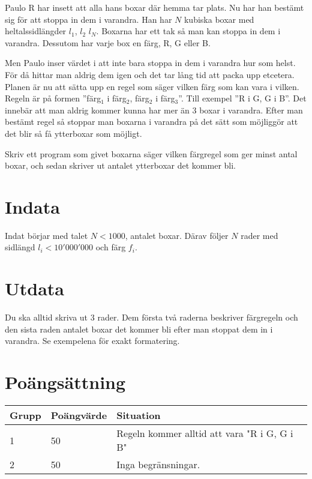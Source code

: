 
Paulo R har insett att alla hans boxar där hemma tar plats. Nu har han bestämt
sig för att stoppa in dem i varandra. Han har $N$ kubiska boxar med
heltalssidlängder $l_1$, $l_2$ \ellipsis $l_N$. Boxarna har ett tak så man kan stoppa in
dem i varandra. Dessutom har varje box en färg, R, G eller B.

Men Paulo inser värdet i att inte bara stoppa in dem i varandra hur som helst.
För då hittar man aldrig dem igen och det tar lång tid att packa upp etcetera.
Planen är nu att sätta upp en regel som säger vilken färg som kan vara i
vilken. Regeln är på formen ''färg$_1$ i färg$_2$, färg$_2$ i färg$_3$''. Till exempel ''R i
G, G i B''. Det innebär att man aldrig kommer kunna har mer än 3 boxar i
varandra. Efter man bestämt regel så stoppar man boxarna i varandra på det sätt
som möjliggör att det blir så få ytterboxar som möjligt.

Skriv ett program som givet boxarna säger vilken färgregel som ger minst antal
boxar, och sedan skriver ut antalet ytterboxar det kommer bli.

\section*{Indata}

Indat börjar med talet $N < 1000$, antalet boxar. Därav följer $N$ rader med sidlängd
$l_i < 10'000'000$ och färg $f_i$.

\section*{Utdata}

Du ska alltid skriva ut 3 rader. Dem första två raderna beskriver färgregeln
och den sista raden antalet boxar det kommer bli efter man stoppat dem in i
varandra. Se exempelena för exakt formatering.

\section*{Poängsättning}

\begin{tabular}{| l | l | l |}
\hline
Grupp & Poängvärde & Situation \\ \hline
1     & 50         & Regeln kommer alltid att vara "R i G, G i B" \\ \hline
2     & 50         & Inga begränsningar. \\ \hline
\end{tabular}
